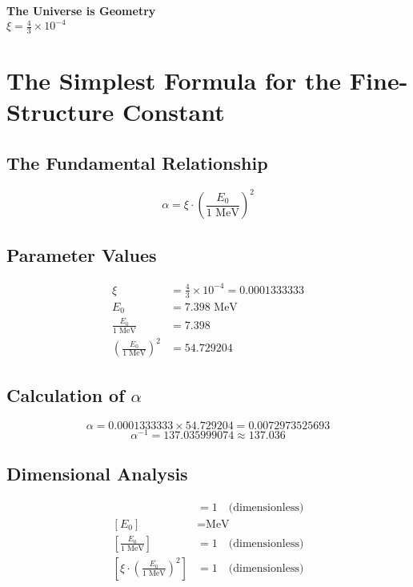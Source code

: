 \documentclass[12pt,a4paper]{article}
\theoremstyle{definition}
\begin{document}
	\begin{center}
		\Large
		\textbf{The Universe is Geometry}\\
		\vspace{1cm}
		\huge
		$\boxed{\xi = \frac{4}{3} \times 10^{-4}}$
	\end{center}

	
	\section*{The Simplest Formula for the Fine-Structure Constant}
	
	\subsection*{The Fundamental Relationship}
	
	\[
	\boxed{\alpha = \xi \cdot \left(\frac{E_0}{1 \text{ MeV}}\right)^2}
	\]
	
	\subsection*{Parameter Values}
	
	\begin{align*}
		\xi &= \frac{4}{3} \times 10^{-4} = 0.0001333333 \\
		E_0 &= 7.398 \text{ MeV} \\
		\frac{E_0}{1 \text{ MeV}} &= 7.398 \\
		\left(\frac{E_0}{1 \text{ MeV}}\right)^2 &= 54.729204
	\end{align*}
	
	\subsection*{Calculation of $\alpha$}
	
	\[
	\alpha = 0.0001333333 \times 54.729204 = 0.0072973525693
	\]
	\[
	\alpha^{-1} = 137.035999074 \approx 137.036
	\]
	
	\subsection*{Dimensional Analysis}
	
	\begin{align*}
		[\xi] &= 1 \quad \text{(dimensionless)} \\
		[E_0] &= \text{MeV} \\
		\left[\frac{E_0}{1 \text{ MeV}}\right] &= 1 \quad \text{(dimensionless)} \\
		\left[\xi \cdot \left(\frac{E_0}{1 \text{ MeV}}\right)^2\right] &= 1 \quad \text{(dimensionless)}
	\end{align*}
	
\end{document}
